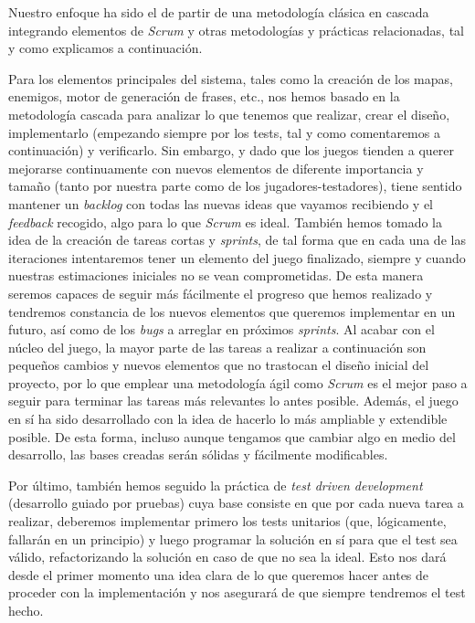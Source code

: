 Nuestro enfoque ha sido el de partir de una metodología clásica en cascada integrando elementos de \textit{Scrum} y otras metodologías y prácticas relacionadas, tal y como explicamos a continuación.

Para los elementos principales del sistema, tales como la creación de los mapas, enemigos, motor de generación de frases, etc., nos hemos basado en la metodología cascada para analizar lo que tenemos que realizar, crear el diseño, implementarlo (empezando siempre por los tests, tal y como comentaremos a continuación) y verificarlo. Sin embargo, y dado que los juegos tienden a querer mejorarse continuamente con nuevos elementos de diferente importancia y tamaño (tanto por nuestra parte como de los jugadores-testadores), tiene sentido mantener un \textit{backlog} con todas las nuevas ideas que vayamos recibiendo y el \textit{feedback} recogido, algo para lo que \textit{Scrum} es ideal. 
También hemos tomado la idea de la creación de tareas cortas y \textit{sprints}, de tal forma que en cada una de las iteraciones intentaremos tener un elemento del juego finalizado, siempre y cuando nuestras estimaciones iniciales no se vean comprometidas. De esta manera seremos capaces de seguir más fácilmente el progreso que hemos realizado y tendremos constancia de los nuevos elementos que queremos implementar en un futuro, así como de los \textit{bugs} a arreglar en próximos \textit{sprints}.
Al acabar con el núcleo del juego, la mayor parte de las tareas a realizar a continuación son pequeños cambios y nuevos elementos que no trastocan el diseño inicial del proyecto, por lo que emplear una metodología ágil como \textit{Scrum} es el mejor paso a seguir para terminar las tareas más relevantes lo antes posible. Además, el juego en sí ha sido desarrollado con la idea de hacerlo lo más ampliable y extendible posible. De esta forma, incluso aunque tengamos que cambiar algo en medio del desarrollo, las bases creadas serán sólidas y fácilmente modificables. 

Por último, también hemos seguido la práctica de \textit{test driven development} (desarrollo guiado por pruebas) cuya base consiste en que por cada nueva tarea a realizar, deberemos implementar primero los tests unitarios (que, lógicamente, fallarán en un principio) y luego programar la solución en sí para que el test sea válido, refactorizando la solución en caso de que no sea la ideal. Esto nos dará desde el primer momento una idea clara de lo que queremos hacer antes de proceder con la implementación y nos asegurará de que siempre tendremos el test hecho.